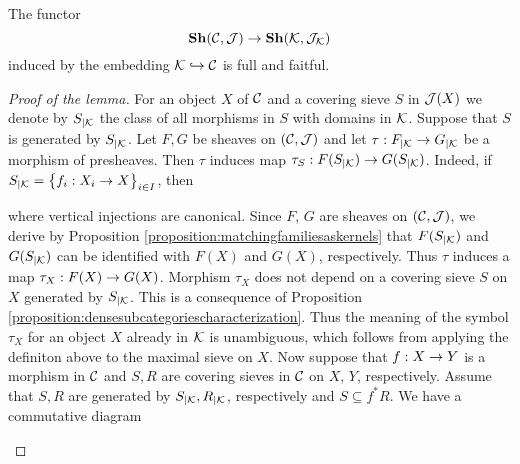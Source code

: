 \begin{lemma}\label{lemma:fullandfatiful}
The functor
$$\mathbf{Sh}({\mathcal C},{\mathcal J})\rightarrow \mathbf{Sh}({\mathcal K},{\mathcal J}_{{\mathcal K}})$$
induced by the embedding ${\mathcal K} \hookrightarrow {\mathcal C}$ is full and faitful.
\end{lemma}
\begin{proof}[Proof of the lemma]
For an object $X$ of ${\mathcal C}$ and a covering sieve $S$ in ${\mathcal J}(X)$ we denote by $S_{\mid {\mathcal K}}$ the class of all morphisms in $S$ with domains in ${\mathcal K}$. Suppose that $S$ is generated by $S_{\mid {\mathcal K}}$. Let $F, G$ be sheaves on $({\mathcal C},{\mathcal J})$ and let $\tau:F_{\mid {\mathcal K}}\rightarrow G_{\mid {\mathcal K}}$ be a morphism of presheaves. Then $\tau$ induces map $\tau_S:F(S_{\mid {\mathcal K}})\rightarrow G(S_{\mid {\mathcal K}})$. Indeed, if $S_{\mid {\mathcal K}} = \big\{f_i:X_i\rightarrow X\big\}_{i\in I}$, then
\begin{center}
\end{center}
where vertical injections are canonical. Since $F$, $G$ are sheaves on $({\mathcal C},{\mathcal J})$, we derive by Proposition \ref{proposition:matchingfamiliesaskernels} that $F(S_{\mid {\mathcal K}})$ and $G(S_{\mid {\mathcal K}})$ can be identified with $F(X)$ and $G(X)$, respectively. Thus $\tau$ induces a map $\tau_X:F(X)\rightarrow G(X)$. Morphism $\tau_X$ does not depend on a covering sieve $S$ on $X$ generated by $S_{\mid {\mathcal K}}$. This is a consequence of Proposition \ref{proposition:densesubcategoriescharacterization}. Thus the meaning of the symbol $\tau_X$ for an object $X$ already in ${\mathcal K}$ is unambiguous, which follows from applying the definiton above to the maximal sieve on $X$. Now suppose that $f:X\rightarrow Y$ is a morphism in ${\mathcal C}$ and $S, R$ are covering sieves in ${\mathcal C}$ on $X$, $Y$, respectively. Assume that $S, R$ are generated by $S_{\mid {\mathcal K}}, R_{\mid {\mathcal K}}$, respectively and $S\subseteq f^*R$. We have a commutative diagram
\begin{center}

\end{center}
\end{proof}

